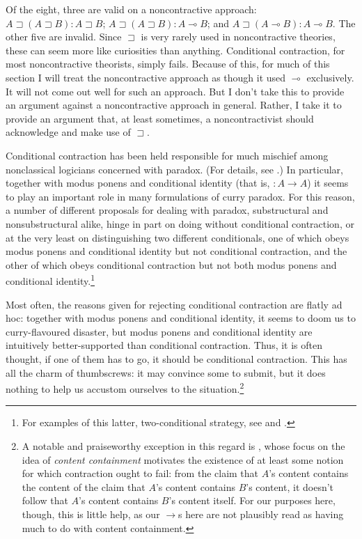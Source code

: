 \documentclass{ergoclass}
\newcommand{\sqq}[2]{\ensuremath{#1  \mathrel{:}  #2}}
\newcommand{\amcond}{\ensuremath{\rightarrow}}
\newcommand{\mcond}{\ensuremath{\multimap}}
\newcommand{\acond}{\ensuremath{\sqsupset}}
\renewcommand{\cite}{\citet}						%
\begin{document}
Of the eight, three are valid on a noncontractive approach: $\sqq{A \acond (A \acond B)}{A \acond B}$; $\sqq{A \acond (A \acond B)}{A \mcond B}$; and $\sqq{A \acond (A \mcond B)}{A \mcond B}$. The other five are invalid. Since $\acond$ is very rarely used in noncontractive theories, these can seem more like curiosities than anything. Conditional contraction, for most noncontractive theorists, simply fails. Because of this, for much of this section I will treat the noncontractive approach as though it used $\mcond$ exclusively. It will not come out well for such an approach. But I don't take this to provide an argument against a noncontractive approach in general. Rather, I take it to provide an argument that, at least sometimes, a noncontractivist should acknowledge and make use of $\acond$.


Conditional contraction has been held responsible for much mischief among nonclassical logicians concerned with paradox. (For details, see \citealt{restall:htbrcf, restall:lwc}.) In particular, together with modus ponens and conditional identity (that is, $\sqq{}{A \to A}$) it seems to play an important role in many formulations of curry paradox. For this reason, a number of different proposals for dealing with paradox, substructural and nonsubstructural alike, hinge in part on doing without conditional contraction, or at the very least on distinguishing two different conditionals, one of which obeys modus ponens and conditional identity but not conditional contraction, and the other of which obeys conditional contraction but not both modus ponens and conditional identity.\footnote{For examples of this latter, two-conditional strategy, see \cite{priest:ic, field:stp} and \cite{beall:sot}.}

Most often, the reasons given for rejecting conditional contraction are flatly ad hoc: together with modus ponens and conditional identity, it seems to doom us to curry-flavoured disaster, but modus ponens and conditional identity are intuitively better-supported than conditional contraction. Thus, it is often thought, if one of them has to go, it should be conditional contraction. This has all the charm of thumbscrews: it may convince some to submit, but it does nothing to help us accustom ourselves to the situation.\footnote{A notable and praiseworthy exception in this regard is \cite{brady:ul}, whose focus on the idea of {\em content containment} motivates the existence of at least some notion for which contraction ought to fail: from the claim that $A$'s content contains the content of the claim that $A$'s content contains $B$'s content, it doesn't follow that $A$'s content contains $B$'s content itself. For our purposes here, though, this is little help, as our $\amcond$s here are not plausibly read as having much to do with content containment.}
\end{document}
